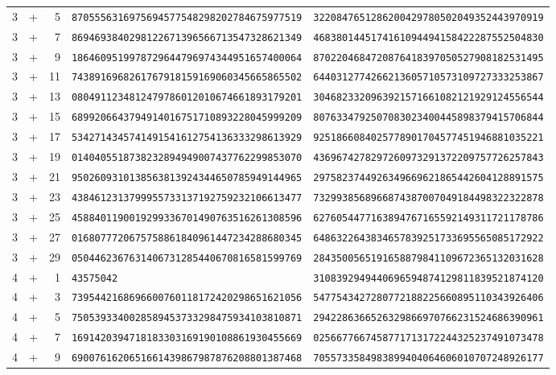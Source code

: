 \begin{longtable}{@{}rcrll@{}}
3&+&5&\texttt{8705556316975694577548298202784675977519}&\texttt{3220847651286200429780502049352443970919}\\
3&+&7&\texttt{8694693840298122671396566713547328621349}&\texttt{4683801445174161094494158422287552504830}\\
3&+&9&\texttt{1864609519978729644796974344951657400064}&\texttt{8702204684720876418397050527908182531495}\\
3&+&11&\texttt{7438916968261767918159169060345665865502}&\texttt{6440312774266213605710573109727333253867}\\
3&+&13&\texttt{0804911234812479786012010674661893179201}&\texttt{3046823320963921571661082121929124556544}\\
3&+&15&\texttt{6899206643794914016751710893228045999209}&\texttt{8076334792507083023400445898379415706844}\\
3&+&17&\texttt{5342714345741491541612754136333298613929}&\texttt{9251866084025778901704577451946881035221}\\
3&+&19&\texttt{0140405518738232894949007437762299853070}&\texttt{4369674278297260973291372209757726257843}\\
3&+&21&\texttt{9502609310138563813924344650785949144965}&\texttt{2975823744926349669621865442604128891575}\\
3&+&23&\texttt{4384612313799955733137192759232106613477}&\texttt{7329938568966874387007049184498322322878}\\
3&+&25&\texttt{4588401190019299336701490763516261308596}&\texttt{6276054477163894767165592149311721178786}\\
3&+&27&\texttt{0168077720675758861840961447234288680345}&\texttt{6486322643834657839251733695565085172922}\\
3&+&29&\texttt{0504462367631406731285440670816581599769}&\texttt{2843500565191658879841109672365132031628}\\
4&+&1&\texttt{43575042}&\texttt{3108392949440696594874129811839521874120}\\
4&+&3&\texttt{7395442168696600760118172420298651621056}&\texttt{5477543427280772188225660895110343926406}\\
4&+&5&\texttt{7505393340028589453733298475934103810871}&\texttt{2942286366526329866970766231524686390961}\\
4&+&7&\texttt{1691420394718183303169190108861930455669}&\texttt{0256677667458771713172244325237491073478}\\
4&+&9&\texttt{6900761620651661439867987876208801387468}&\texttt{7055733584983899404064606010707248926177}\\

\end{longtable}
